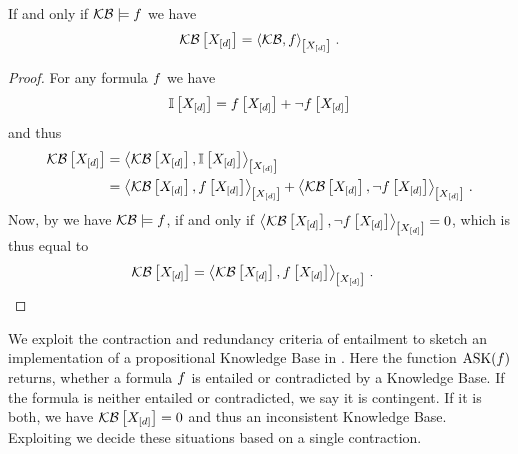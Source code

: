 \begin{theorem}
    \label{the:ReduncancyOfEntailed}
    If and only if $\mathcal{KB}\models f$ we have
    \begin{align*}
        \mathcal{KB}\left[X_{[d]}\right]= \left\langle \mathcal{KB},f\right\rangle_{\left[ X_{[d]} \right]}  \, .
    \end{align*}
\end{theorem}
\begin{proof}
    For any formula $f$ we have
    \begin{align*}
        \mathbb{I}\left[X_{[d]}\right] = f\left[X_{[d]}\right] + \lnot f\left[X_{[d]}\right]
    \end{align*}
    and thus
    \begin{align*}
        \mathcal{KB}\left[X_{[d]}\right]
        & = \left\langle \mathcal{KB}\left[X_{[d]}\right],\mathbb{I}\left[X_{[d]}\right]\right\rangle_{\left[ X_{[d]} \right]} \\
        & = \left\langle \mathcal{KB}\left[X_{[d]}\right],f\left[X_{[d]}\right]\right\rangle_{\left[ X_{[d]} \right]} +  \left\langle \mathcal{KB}\left[X_{[d]}\right],\lnot f\left[X_{[d]}\right]\right\rangle_{\left[ X_{[d]} \right]} \, .
    \end{align*}
    Now, by  we have $\mathcal{KB}\models f$, if and only if $\left\langle \mathcal{KB}\left[X_{[d]}\right],\lnot f\left[X_{[d]}\right]\right\rangle_{\left[ X_{[d]} \right]}=0$, which is thus equal to
    \begin{align*}
        \mathcal{KB}\left[X_{[d]}\right]
        = \left\langle \mathcal{KB}\left[X_{[d]}\right],f\left[X_{[d]}\right]\right\rangle_{\left[ X_{[d]} \right]} \, . & \qedhere
    \end{align*}
\end{proof}



We exploit the contraction and redundancy criteria of entailment to sketch an implementation of a propositional Knowledge Base in .
Here the function $\mathrm{ASK}(f)$ returns, whether a formula $f$ is entailed or contradicted by a Knowledge Base.
If the formula is neither entailed or contradicted, we say it is contingent.
If it is both, we have $\mathcal{KB}\left[X_{[d]}\right]=0$ and thus an inconsistent Knowledge Base.
Exploiting  we decide these situations based on a single contraction.

